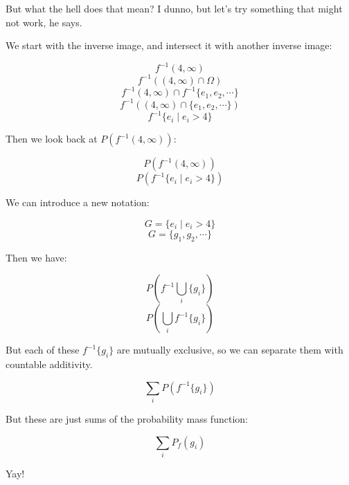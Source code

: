\documentclass{article}
\newcommand{\inv}[1]{#1^{-1}}
\begin{document}
But what the hell does that mean? I dunno, but let's try something
that might not work, he says.

We start with the inverse image, and intersect it with another inverse
image:

\[
\inv{f}(4,\infty)
\] \[
\inv{f}((4,\infty)\cap\Omega)
\] \[
\inv{f}(4,\infty)\cap\inv{f}\{e_1,e_2,\cdots\}
\] \[
\inv{f}((4,\infty)\cap\{e_1,e_2,\cdots\})
\] \[
\inv{f}\{e_i\mid e_i>4\}
\]

Then we look back at $P(\inv{f}(4,\infty))$:

\[
P(\inv{f}(4,\infty))
\] \[
P(\inv{f}\{e_i\mid e_i>4\})
\]

We can introduce a new notation:

\[
G=\{e_i\mid e_i>4\}
\] \[
G=\{g_1,g_2,\cdots\}
\]

Then we have:

\[
P\left(\inv{f}\bigcup\limits_i \{g_i\}\right)
\] \[
P\left(\bigcup\limits_i\inv{f}\{g_i\}\right)
\]

But each of these $\inv{f}\{g_i\}$ are mutually exclusive, so we can
separate them with countable additivity.

\[
\sum\limits_i P(\inv{f}\{g_i\})
\]

But these are just sums of the probability mass function:

\[
\sum\limits_i P_f(g_i)
\]

Yay!
\end{document}

